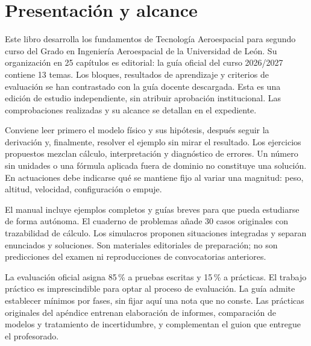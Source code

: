 
\renewcommand{\studiumvolumetype}{manual}

\frontmatter
\studiumreadingguide
\chapter*{Presentación y alcance}
Este libro desarrolla los fundamentos de Tecnología Aeroespacial para segundo curso del Grado en Ingeniería Aeroespacial de la Universidad de León. Su organización en 25 capítulos es editorial: la guía oficial del curso 2026/2027 contiene 13 temas. Los bloques, resultados de aprendizaje y criterios de evaluación se han contrastado con la guía docente descargada. Esta es una edición de estudio independiente, sin atribuir aprobación institucional. Las comprobaciones realizadas y su alcance se detallan en el expediente.

Conviene leer primero el modelo físico y sus hipótesis, después seguir la derivación y, finalmente, resolver el ejemplo sin mirar el resultado. Los ejercicios propuestos mezclan cálculo, interpretación y diagnóstico de errores. Un número sin unidades o una fórmula aplicada fuera de dominio no constituye una solución. En actuaciones debe indicarse qué se mantiene fijo al variar una magnitud: peso, altitud, velocidad, configuración o empuje.

El manual incluye ejemplos completos y guías breves para que pueda estudiarse de forma autónoma. El cuaderno de problemas añade 30 casos originales con trazabilidad de cálculo. Los simulacros proponen situaciones integradas y separan enunciados y soluciones. Son materiales editoriales de preparación; no son predicciones del examen ni reproducciones de convocatorias anteriores.

La evaluación oficial asigna 85\,\% a pruebas escritas y 15\,\% a prácticas. El trabajo práctico es imprescindible para optar al proceso de evaluación. La guía admite establecer mínimos por fases, sin fijar aquí una nota que no conste. Las prácticas originales del apéndice entrenan elaboración de informes, comparación de modelos y tratamiento de incertidumbre, y complementan el guion que entregue el profesorado.




